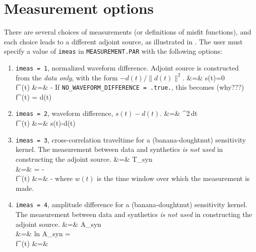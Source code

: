 \documentclass[11pt,titlepage,fleqn]{article}
\begin{document}

\section{Measurement options}
\label{sec:meas}

There are several choices of measurements (or definitions of misfit functions), and each choice leads to a different adjoint source, as illustrated in \citet{Tromp2005}. The user must specify a value of \verb+imeas+ in \verb+MEASUREMENT.PAR+ with the following options:
%
\begin{enumerate}
\item \verb+imeas = 1+, normalized waveform difference. Adjoint source is constructed from the {\em data only}, with the form $-d(t)/\|d(t)\|^2$.
\eqa
\phi &=&  \quad {}\quad s(t)=0 \nn\\
f^\dagger(t) &=& - \nn
\ena
If \verb+NO_WAVEFORM_DIFFERENCE = .true.+, this becomes (why???)
\eq
f^\dagger(t) = d(t) \nn
\en

\item \verb+imeas = 2+, waveform difference, $s(t) - d(t)$.
\eqa
\phi &=&  \int [d(t)-s(t)]^2\,dt  \nn\\
f^\dagger(t) &=& s(t)-d(t) \nn
\ena

\item \verb+imeas = 3+, cross-correlation traveltime for a (banana-doughtnut) sensitivity kernel. The measurement between data and synthetics {\em is not used} in constructing the adjoint source.
\eqa
\phi &=& T_{syn}  \nn\\
\delta \phi &=&  = -  
\quad\quad\quad{}\nn \\
f^\dagger(t) &=& - \nn
\ena
where $w(t)$ is the time window over which the measurement is made. 

\item \verb+imeas = 4+, amplitude difference for a (banana-doughtnut) sensitivity kernel. The measurement between data and synthetics {\em is not used} in constructing the adjoint source. 
\eqa
\phi &=&  \ln A_{syn}  \nn\\
\delta \phi &=& \delta ln A_{syn} =  
\quad\quad\quad{}
\nn \\
f^\dagger(t) &=&  \nn
\ena


\end{enumerate}
\end{document}
